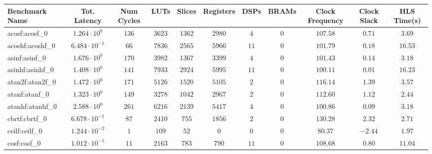 \begin{tabular}{|l|c|c|c|c|c|c|c|c|c|c|}
\hline
Benchmark Name               & Tot. Latency            & Num Cycles & LUTs       & Slices    & Registers & DSPs    & BRAMs & Clock Frequency & Clock Slack & HLS Time(s) \\
\hline
acosf:acosf\_0               & $ 1.264 \cdot 10^{0}  $ & $ 136    $ & $ 3623   $ & $ 1362  $ & $ 2980  $ & $ 4   $ & $ 0 $ & $ 107.58      $ & $ 0.71    $ & $ 3.69    $ \\
acoshf:acoshf\_0             & $ 6.484 \cdot 10^{-1} $ & $ 66     $ & $ 7836   $ & $ 2565  $ & $ 5966  $ & $ 11  $ & $ 0 $ & $ 101.79      $ & $ 0.18    $ & $ 16.53   $ \\
asinf:asinf\_0               & $ 1.676 \cdot 10^{0}  $ & $ 170    $ & $ 3982   $ & $ 1367  $ & $ 3399  $ & $ 4   $ & $ 0 $ & $ 101.43      $ & $ 0.14    $ & $ 3.18    $ \\
asinhf:asinhf\_0             & $ 1.408 \cdot 10^{0}  $ & $ 141    $ & $ 7933   $ & $ 2924  $ & $ 5995  $ & $ 11  $ & $ 0 $ & $ 100.11      $ & $ 0.01    $ & $ 16.23   $ \\
atan2f:atan2f\_0             & $ 1.472 \cdot 10^{0}  $ & $ 171    $ & $ 5126   $ & $ 1520  $ & $ 5105  $ & $ 2   $ & $ 0 $ & $ 116.14      $ & $ 1.39    $ & $ 3.57    $ \\
atanf:atanf\_0               & $ 1.323 \cdot 10^{0}  $ & $ 149    $ & $ 3278   $ & $ 1042  $ & $ 2967  $ & $ 2   $ & $ 0 $ & $ 112.60      $ & $ 1.12    $ & $ 2.44    $ \\
atanhf:atanhf\_0             & $ 2.588 \cdot 10^{0}  $ & $ 261    $ & $ 6216   $ & $ 2139  $ & $ 5417  $ & $ 4   $ & $ 0 $ & $ 100.86      $ & $ 0.09    $ & $ 3.18    $ \\
cbrtf:cbrtf\_0               & $ 6.678 \cdot 10^{-1} $ & $ 87     $ & $ 2410   $ & $ 755   $ & $ 1856  $ & $ 2   $ & $ 0 $ & $ 130.28      $ & $ 2.32    $ & $ 2.71    $ \\
ceilf:ceilf\_0               & $ 1.244 \cdot 10^{-2} $ & $ 1      $ & $ 109    $ & $ 52    $ & $ 0     $ & $ 0   $ & $ 0 $ & $ 80.37       $ & $ -2.44   $ & $ 1.97    $ \\
cosf:cosf\_0                 & $ 1.012 \cdot 10^{-1} $ & $ 11     $ & $ 2163   $ & $ 783   $ & $ 790   $ & $ 11  $ & $ 0 $ & $ 108.68      $ & $ 0.80    $ & $ 11.04   $ \\

\end{tabular}
